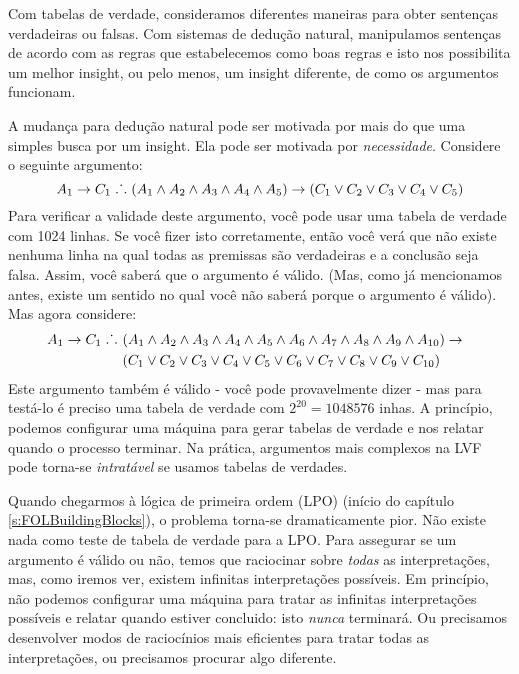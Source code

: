 Com tabelas de verdade,  consideramos diferentes maneiras  para obter senten\c cas verdadeiras ou falsas. Com sistemas de dedu\c c\~ao natural, manipulamos  senten\c cas de acordo com as regras que estabelecemos como boas regras e isto nos possibilita um melhor insight, ou pelo menos, um insight diferente,  de como os argumentos funcionam. 

A mudan\c ca para dedu\c c\~ao natural pode ser motivada por mais do que uma simples busca por um insight. Ela pode ser motivada por  \emph{necessidade}. Considere o seguinte argumento:
$$A_1 \rightarrow C_1 \mathrel{\ldotp\dot{}\,\ldotp} (A_1 \wedge A_2 \wedge A_3 \wedge A_4 \wedge A_5) \rightarrow (C_1 \vee C_2 \vee C_3 \vee C_4 \vee C_5)$$
Para verificar a validade deste argumento, voc\^e   pode usar uma tabela de verdade com 1024 linhas. Se voc\^e fizer isto corretamente, ent\~ao voc\^e ver\'a que  n\~ao existe nenhuma linha na qual todas as premissas s\~ao verdadeiras e a conclus\~ao seja falsa.  Assim, voc\^e saber\'a que o argumento \'e v\'alido.  (Mas,  como  j\'a mencionamos antes, existe um sentido no qual voc\^e n\~ao saber\'a porque o argumento \'e v\'alido). Mas agora considere: 
\begin{align*}
A_1 \rightarrow C_1 \mathrel{\ldotp\dot{}\,\ldotp}\ & (A_1 \wedge A_2 \wedge A_3 \wedge A_4 \wedge A_5 \wedge A_6 \wedge A_7 \wedge A_8 \wedge A_9 \wedge A_{10}) \rightarrow \phantom{(}\\
&(C_1 \vee C_2 \vee C_3 \vee C_4 \vee C_5 \vee C_6 \vee C_7 \vee C_8 \vee C_9 \vee C_{10})
\end{align*}
Este argumento tamb\'em \'e v\'alido - voc\^e pode provavelmente dizer - mas para test\'a-lo \'e preciso uma tabela de verdade com
 $2^{20} = 1048576$ inhas.  A princ\'ipio, podemos configurar uma m\'aquina para gerar tabelas de verdade e nos relatar quando o processo terminar. Na pr\'atica, argumentos mais complexos na LVF pode torna-se \emph{intrat\'avel} se usamos tabelas de verdades. 
 
 Quando chegarmos \`a l\'ogica de primeira ordem (LPO) (in\'icio do cap\'itulo   \ref{s:FOLBuildingBlocks}),   o problema torna-se dramaticamente pior.  N\~ao existe nada como teste de tabela de verdade para a LPO.  Para assegurar se um argumento \'e v\'alido ou n\~ao,  temos que raciocinar sobre  \emph{todas}   as interpreta\c c\~oes,  mas, como iremos ver, existem  infinitas interpreta\c c\~oes  poss\'iveis.   Em princ\'ipio, n\~ao podemos configurar uma m\'aquina para tratar as infinitas interpreta\c c\~oes poss\'iveis e relatar quando estiver  concluido:  isto  \emph{nunca}  terminar\'a. Ou precisamos desenvolver modos de racioc\'inios mais eficientes para tratar todas as interpreta\c c\~oes, ou precisamos procurar algo diferente. 


